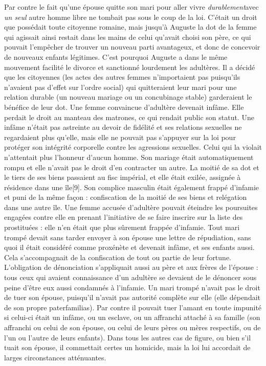  Par contre le fait qu'une épouse quitte son mari pour aller vivre \emph{durablement}avec \emph{un seul} autre homme libre ne tombait pas sous le coup de la loi. C'était un droit que possédait toute citoyenne romaine, mais jusqu'à Auguste la dot de la femme qui agissait ainsi restait dans les mains de celui qu'avait choisi son père, ce qui pouvait l'empêcher de trouver un nouveau parti avantageux, et donc de concevoir de nouveaux enfants légitimes. C'est pourquoi Auguste a dans le même mouvement facilité le divorce et sanctionné lourdement les adultères. Il a décidé que les citoyennes (les actes des autres femmes n'importaient pas puisqu'ils n'avaient pas d'effet sur l'ordre social) qui quitteraient leur mari pour une relation durable (un nouveau mariage ou un concubinage stable) garderaient le bénéfice de leur dot. 
 Une femme convaincue d'adultère devenait infâme. Elle perdait le droit au manteau des matrones, ce qui rendait public son statut. Une infâme n'était pas astreinte au devoir de fidélité et ses relations sexuelles ne regardaient plus qu'elle, mais elle ne pouvait pas s'appuyer sur la loi pour protéger son intégrité corporelle contre les agressions sexuelles. Celui qui la violait n'attentait plus l'honneur d'aucun homme. Son mariage était automatiquement rompu et elle n'avait pas le droit d'en contracter un autre. La moitié de sa dot et le tiers de ses biens passaient au fisc impérial, et elle était exilée, assignée à résidence dans une île[9]. Son complice masculin était également frappé d'infamie et puni de la même façon : confiscation de la moitié de ses biens et relégation dans une autre île. Une femme accusée d'adultère pouvait éteindre les poursuites engagées contre elle en prenant l'initiative de se faire inscrire sur la liste des prostituées : elle n'en était que plus sûrement frappée d'infamie. 
 Tout mari trompé devait sans tarder envoyer à son épouse une lettre de répudiation, sans quoi il était considéré comme proxénète et devenait infâme, et ses enfants aussi. Cela s'accompagnait de la confiscation de tout ou partie de leur fortune. L'obligation de dénonciation s'appliquait aussi au père et aux frères de l'épouse : tous ceux qui avaient connaissance d'un adultère se devaient de le dénoncer sous peine d'être eux aussi condamnés à l'infamie.
 Un mari trompé n'avait pas le droit de tuer son épouse, puisqu'il n'avait pas autorité complète sur elle (elle dépendait de son propre paterfamilias). Par contre il pouvait tuer l'amant en toute impunité si celui-ci était un infâme, ou un esclave, ou un affranchi attaché à sa famille (son affranchi ou celui de son épouse, ou celui de leurs pères ou mères respectifs, ou de l'un ou l'autre de leurs enfants). Dans tous les autres cas de figure, ou bien s'il tuait son épouse, il commettait certes un homicide, mais la loi lui accordait de larges circonstances atténuantes. 

